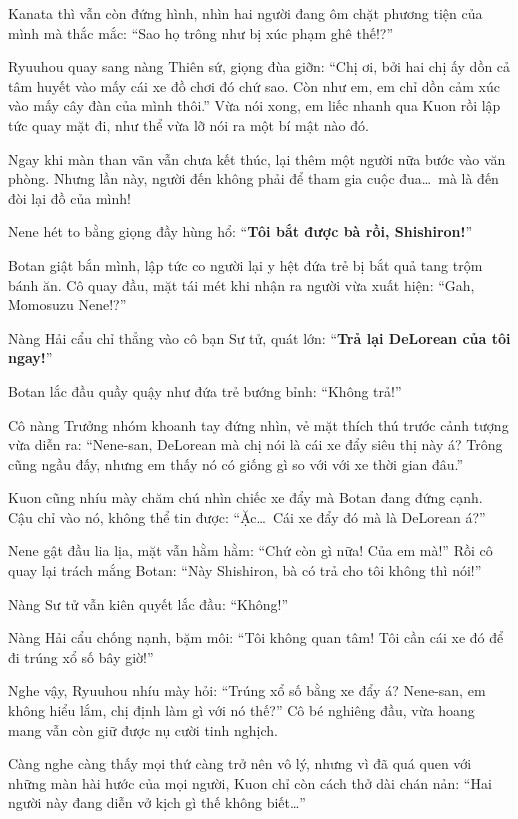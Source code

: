 \documentclass[../main.tex]{subfiles}
\begin{document}
Kanata thì vẫn còn đứng hình, nhìn hai người đang ôm chặt phương tiện của mình mà thắc mắc: ``Sao họ trông như bị xúc phạm ghê thế!?''

Ryuuhou quay sang nàng Thiên sứ, giọng đùa giỡn: ``Chị ơi, bởi hai chị ấy dồn cả tâm huyết vào mấy cái xe đồ chơi đó chứ sao. Còn như em, em chỉ dồn cảm xúc vào mấy cây đàn của mình thôi.'' Vừa nói xong, em liếc nhanh qua Kuon rồi lập tức quay mặt đi, như thể vừa lỡ nói ra một bí mật nào đó.

Ngay khi màn than vãn vẫn chưa kết thúc, lại thêm một người nữa bước vào văn phòng. Nhưng lần này, người đến không phải để tham gia cuộc đua\dots\ mà là đến đòi lại đồ của mình!

Nene hét to bằng giọng đầy hùng hổ: ``\textbf{Tôi bắt được bà rồi, Shishiron!}''

Botan giật bắn mình, lập tức co người lại y hệt đứa trẻ bị bắt quả tang trộm bánh ăn. Cô quay đầu, mặt tái mét khi nhận ra người vừa xuất hiện: ``Gah, Momosuzu Nene!?''

Nàng Hải cẩu chỉ thẳng vào cô bạn Sư tử, quát lớn: ``\textbf{Trả lại DeLorean của tôi ngay!}''

Botan lắc đầu quầy quậy như đứa trẻ bướng bỉnh: ``Không trả!''

Cô nàng Trưởng nhóm khoanh tay đứng nhìn, vẻ mặt thích thú trước cảnh tượng vừa diễn ra: ``Nene-san, DeLorean mà chị nói là cái xe đẩy siêu thị này á? Trông cũng ngầu đấy, nhưng em thấy nó có giống gì so với với xe thời gian đâu.''

Kuon cũng nhíu mày chăm chú nhìn chiếc xe đẩy mà Botan đang đứng cạnh. Cậu chỉ vào nó, không thể tin được: ``Ặc\dots\ Cái xe đẩy đó mà là DeLorean á?''

Nene gật đầu lia lịa, mặt vẫn hằm hằm: ``Chứ còn gì nữa! Của em mà!'' Rồi cô quay lại trách mắng Botan: ``Này Shishiron, bà có trả cho tôi không thì nói!''

Nàng Sư tử vẫn kiên quyết lắc đầu: ``Không!''

Nàng Hải cẩu chống nạnh, bặm môi: ``Tôi không quan tâm! Tôi cần cái xe đó để đi trúng xổ số bây giờ!''

Nghe vậy, Ryuuhou nhíu mày hỏi: ``Trúng xổ số bằng xe đẩy á? Nene-san, em không hiểu lắm, chị định làm gì với nó thế?'' Cô bé nghiêng đầu, vừa hoang mang vẫn còn giữ được nụ cười tinh nghịch.

Càng nghe càng thấy mọi thứ càng trở nên vô lý, nhưng vì đã quá quen với những màn hài hước của mọi người, Kuon chỉ còn cách thở dài chán nản: ``Hai người này đang diễn vở kịch gì thế không biết\dots''
\end{document}
